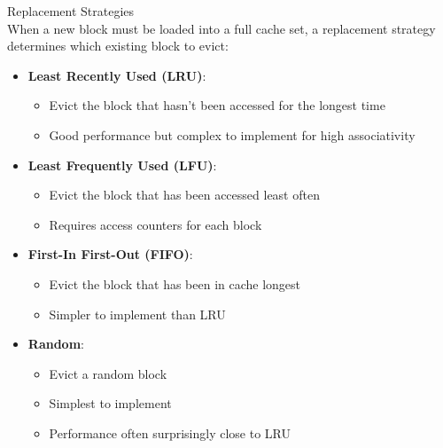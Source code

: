 \begin{definition}{Replacement Strategies}\\
When a new block must be loaded into a full cache set, a replacement strategy determines which existing block to evict:
\begin{itemize}
    \item \textbf{Least Recently Used (LRU)}:
    \begin{itemize}
        \item Evict the block that hasn't been accessed for the longest time
        \item Good performance but complex to implement for high associativity
    \end{itemize}
    \item \textbf{Least Frequently Used (LFU)}:
    \begin{itemize}
        \item Evict the block that has been accessed least often
        \item Requires access counters for each block
    \end{itemize}
    \item \textbf{First-In First-Out (FIFO)}:
    \begin{itemize}
        \item Evict the block that has been in cache longest
        \item Simpler to implement than LRU
    \end{itemize}
    \item \textbf{Random}:
    \begin{itemize}
        \item Evict a random block
        \item Simplest to implement
        \item Performance often surprisingly close to LRU
    \end{itemize}
\end{itemize}
\end{definition}

